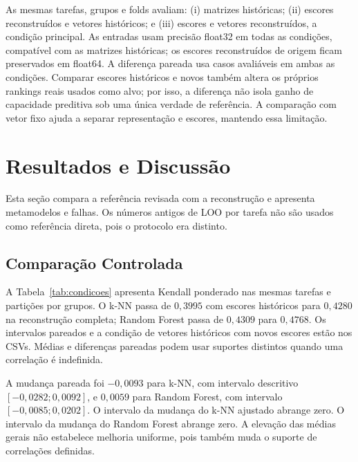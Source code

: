 \documentclass[kdmile,a4paper]{kdmile} %
\begin{document}
As mesmas tarefas, grupos e folds avaliam: (i) matrizes históricas; (ii) escores reconstruídos e vetores históricos; e (iii) escores e vetores reconstruídos, a condição principal. As entradas usam precisão float32 em todas as condições, compatível com as matrizes históricas; os escores reconstruídos de origem ficam preservados em float64. A diferença pareada usa casos avaliáveis em ambas as condições. Comparar escores históricos e novos também altera os próprios rankings reais usados como alvo; por isso, a diferença não isola ganho de capacidade preditiva sob uma única verdade de referência. A comparação com vetor fixo ajuda a separar representação e escores, mantendo essa limitação.

\section{Resultados e Discussão}

Esta seção compara a referência revisada com a reconstrução e apresenta metamodelos e falhas. Os números antigos de LOO por tarefa não são usados como referência direta, pois o protocolo era distinto.

\subsection{Comparação Controlada}

A Tabela~\ref{tab:condicoes} apresenta Kendall ponderado nas mesmas tarefas e partições por grupos. O k-NN passa de $0{,}3995$ com escores históricos para $0{,}4280$ na reconstrução completa; Random Forest passa de $0{,}4309$ para $0{,}4768$. Os intervalos pareados e a condição de vetores históricos com novos escores estão nos CSVs. Médias e diferenças pareadas podem usar suportes distintos quando uma correlação é indefinida.

A mudança pareada foi $-0{,}0093$ para k-NN, com intervalo descritivo $[-0{,}0282;0{,}0092]$, e $0{,}0059$ para Random Forest, com intervalo $[-0{,}0085;0{,}0202]$. O intervalo da mudança do k-NN ajustado abrange zero. O intervalo da mudança do Random Forest abrange zero. A elevação das médias gerais não estabelece melhoria uniforme, pois também muda o suporte de correlações definidas.

\begin{table}[htbp]
\centering
\caption{Referência revisada e reconstrução da Fase 1.}
\label{tab:condicoes}
\resizebox{\linewidth}{!}{}
\end{table}
\end{document}
